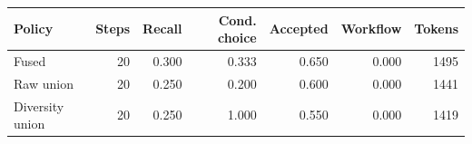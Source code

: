 \begin{tabular}{lrrrrrr}
\toprule
Policy & Steps & Recall & Cond. choice & Accepted & Workflow & Tokens \\
\midrule
Fused & 20 & 0.300 & 0.333 & 0.650 & 0.000 & 1495 \\
Raw union & 20 & 0.250 & 0.200 & 0.600 & 0.000 & 1441 \\
Diversity union & 20 & 0.250 & 1.000 & 0.550 & 0.000 & 1419 \\
\bottomrule
\end{tabular}
